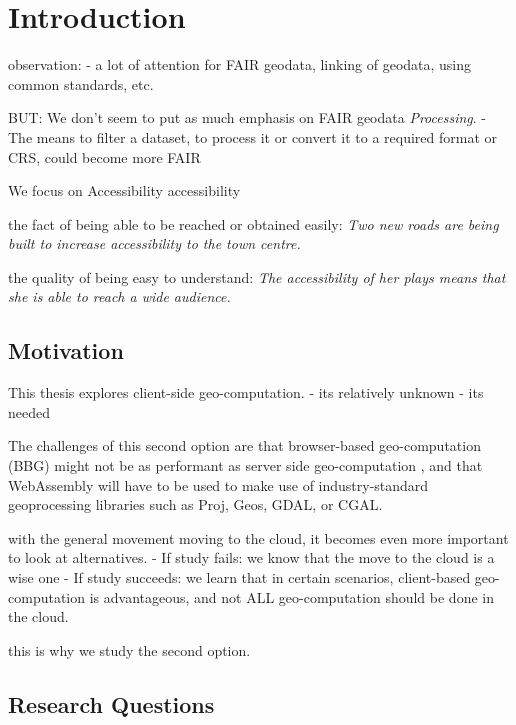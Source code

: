 \chapter{Introduction}


observation: 
- a lot of attention for FAIR geodata, linking of geodata, using common standards, etc. 

BUT: We don't seem to put as much emphasis on FAIR geodata \emph{Processing}. 
- The means to filter a dataset, to process it or convert it to a required format or CRS, could become more FAIR

We focus on Accessibility
accessibility

\m{->} the fact of being able to be reached or obtained easily:
\textit{Two new roads are being built to increase accessibility to the town centre.}

\m{->} the quality of being easy to understand: 
\textit{The accessibility of her plays means that she is able to reach a wide audience.}



\section{Motivation}



This thesis explores client-side geo-computation. 
- its relatively unknown 
- its needed  

The challenges of this second option are that browser-based geo-computation (BBG) might not be as performant as server side geo-computation \cite{panidi_hybrid_2015, hamilton_client-side_2014}, and that WebAssembly will have to be used to make use of industry-standard geoprocessing libraries such as Proj, Geos, GDAL, or CGAL.

with the general movement moving to the cloud, it becomes even more important to look at alternatives. 
- If study fails: we know that the move to the cloud is a wise one
- If study succeeds: we learn that in certain scenarios, client-based geo-computation is advantageous, and not ALL geo-computation should be done in the cloud.

this is why we study the second option. 

\newpage
\section{Research Questions}

